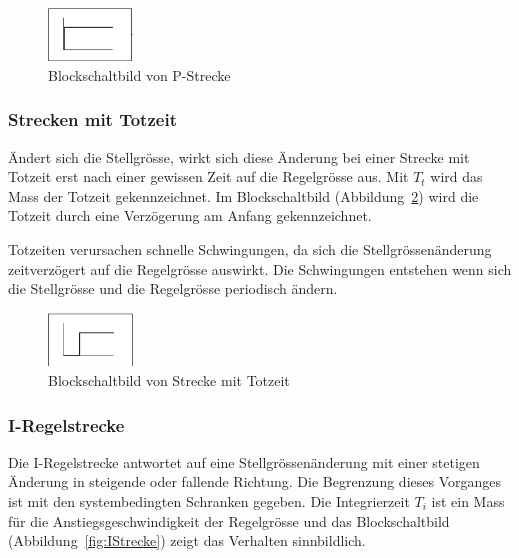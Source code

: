 \begin{figure}[h!, width=\pagewidth]
    \centering
    \includegraphics[width=0.2\textwidth]{images/PStrecke}
    \caption{Blockschaltbild von P-Strecke}
    \label{fig:PStrecke}
\end{figure}


\subsubsection*{Strecken mit Totzeit}
\"Andert  sich  die  Stellgr\"osse,  wirkt sich  diese  \"Anderung  bei  einer
Strecke  mit Totzeit  erst  nach  einer gewissen  Zeit  auf die  Regelgr\"osse
aus. Mit $T_t$  wird das  Mass der Totzeit  gekennzeichnet. Im Blockschaltbild
(Abbildung~\ref{fig:TotZeit})  wird die  Totzeit durch  eine Verz\"ogerung  am
Anfang gekennzeichnet.

Totzeiten     verursachen    schnelle     Schwingungen,     da    sich     die
Stellgr\"ossen\"anderung zeitverz\"ogert  auf die  Regelgr\"osse auswirkt. Die
Schwingungen  entstehen  wenn sich  die  Stellgr\"osse  und die  Regelgr\"osse
periodisch \"andern.

\begin{figure}[h!, width=\pagewidth]
    \centering
    \includegraphics[width=0.2\textwidth]{images/TotZeit}
    \caption{Blockschaltbild von Strecke mit Totzeit}
    \label{fig:TotZeit}
\end{figure}


\subsubsection*{I-Regelstrecke}

Die  I-Regelstrecke  antwortet  auf eine  Stellgr\"ossen\"anderung  mit  einer
stetigen \"Anderung in steigende oder fallende Richtung. Die Begrenzung dieses
Vorganges  ist mit  den systembedingten  Schranken gegeben. Die  Integrierzeit
$T_i$  ist  ein  Mass  f\"ur  die  Anstiegsgeschwindigkeit  der  Regelgr\"osse
und  das Blockschaltbild  (Abbildung~\ref{fig:IStrecke})  zeigt das  Verhalten
sinnbildlich.

